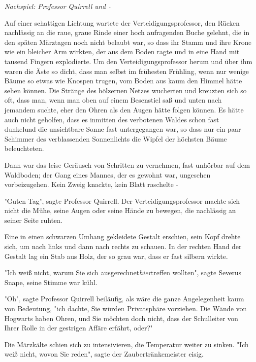 {\emph{Nachspiel: Professor Quirrell und -}

Auf einer schattigen Lichtung wartete der Verteidigungsprofessor, den Rücken nachlässig an die raue, graue Rinde einer hoch aufragenden Buche gelehnt, die in den späten Märztagen noch nicht belaubt war, so dass ihr Stamm und ihre Krone wie ein bleicher Arm wirkten, der aus dem Boden ragte und in eine Hand mit tausend Fingern explodierte. Um den Verteidigungsprofessor herum und über ihm waren die Äste so dicht, dass man selbst im frühesten Frühling, wenn nur wenige Bäume so etwas wie Knospen trugen, vom Boden aus kaum den Himmel hätte sehen können. Die Stränge des hölzernen Netzes wucherten und kreuzten sich so oft, dass man, wenn man oben auf einem Besenstiel saß und unten nach jemandem suchte, eher den Ohren als den Augen hätte folgen können. Es hätte auch nicht geholfen, dass es inmitten des verbotenen Waldes schon fast dunkelund die unsichtbare Sonne fast untergegangen war, so dass nur ein paar Schimmer des verblassenden Sonnenlichts die Wipfel der höchsten Bäume beleuchteten.

Dann war das leise Geräusch von Schritten zu vernehmen, fast unhörbar auf dem Waldboden; der Gang eines Mannes, der es gewohnt war, ungesehen vorbeizugehen. Kein Zweig knackte, kein Blatt raschelte -

"Guten Tag", sagte Professor Quirrell. Der Verteidigungsprofessor machte sich nicht die Mühe, seine Augen oder seine Hände zu bewegen, die nachlässig an seiner Seite ruhten.

Eine in einen schwarzen Umhang gekleidete Gestalt erschien, sein Kopf drehte sich, um nach links und dann nach rechts zu schauen. In der rechten Hand der Gestalt lag ein Stab aus Holz, der so grau war, dass er fast silbern wirkte.

"Ich weiß nicht, warum Sie sich ausgerechnet\emph{hier}treffen wollten", sagte Severus Snape, seine Stimme war kühl.

"Oh", sagte Professor Quirrell beiläufig, als wäre die ganze Angelegenheit kaum von Bedeutung, "ich dachte, Sie würden Privatsphäre vorziehen. Die Wände von Hogwarts haben Ohren, und Sie möchten doch nicht, dass der Schulleiter von Ihrer Rolle in der gestrigen Affäre erfährt, oder?"

Die Märzkälte schien sich zu intensivieren, die Temperatur weiter zu sinken. "Ich weiß nicht, wovon Sie reden", sagte der Zaubertränkemeister eisig.

}
